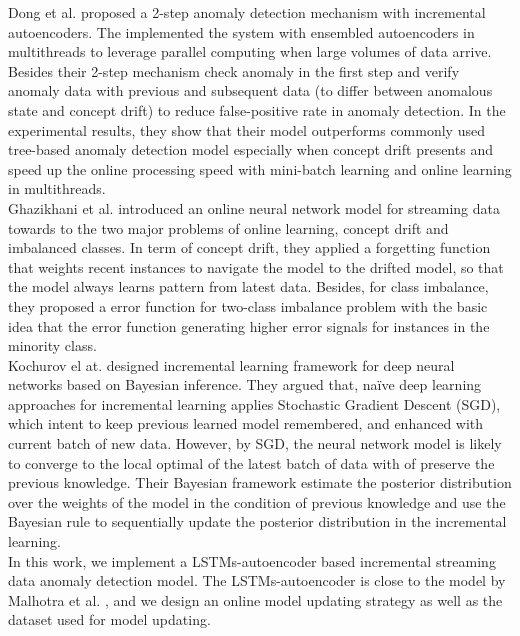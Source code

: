 Dong et al. \cite{threaded} proposed a 2-step anomaly detection mechanism with incremental autoencoders. The implemented the system with ensembled autoencoders in multithreads to leverage parallel computing when large volumes of data arrive. Besides their 2-step mechanism check anomaly in the first step and verify anomaly data with previous and subsequent data (to differ between anomalous state and concept drift) to reduce false-positive rate in anomaly detection. In the experimental results, they show that their model outperforms commonly used tree-based anomaly detection model especially when concept drift presents and speed up the online processing speed with mini-batch learning and online learning in multithreads.\\

Ghazikhani et al. \cite{onlinenn} introduced an online neural network model for streaming data towards to the two major problems of online learning, concept drift and imbalanced classes. In term of concept drift, they applied a forgetting function that weights recent instances to navigate the model to the drifted model, so that the model always learns pattern from latest data. Besides, for class imbalance, they proposed a error function for two-class imbalance problem with the basic idea that the error function generating higher error signals for instances in the minority class.\\

Kochurov el at. \cite{bayesian} designed incremental learning framework for deep neural networks based on Bayesian inference. They argued that, naïve deep learning approaches for incremental learning applies Stochastic Gradient Descent (SGD), which intent to keep previous learned model remembered, and enhanced with current batch of new data. However, by SGD, the neural network model is likely to converge to the local optimal of the latest batch of data with of preserve the previous knowledge. Their Bayesian framework estimate the posterior distribution over the weights of the model in the condition of previous knowledge and use the Bayesian rule to sequentially update the posterior distribution in the incremental learning.\\

In this work, we implement a LSTMs-autoencoder based incremental streaming data anomaly detection model. The LSTMs-autoencoder is close to the model by Malhotra et al. \cite{encdecad}, and we design an online model updating strategy as well as the dataset used for model updating. 








